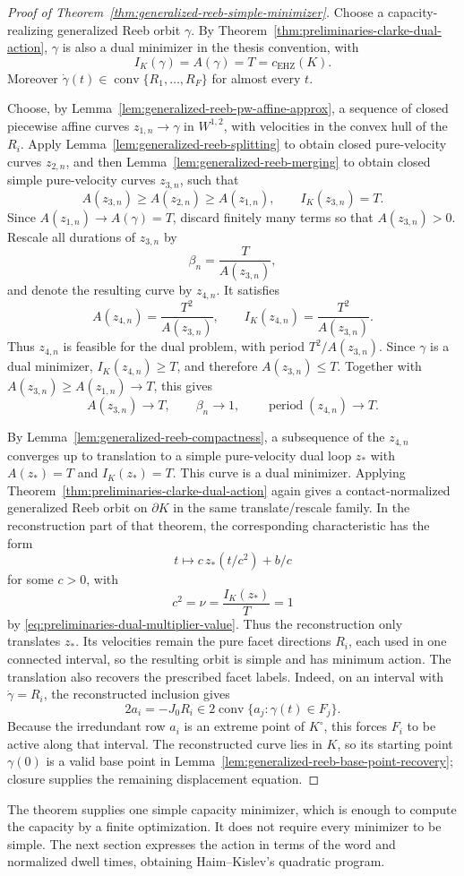 \begin{proof}[Proof of Theorem~\ref{thm:generalized-reeb-simple-minimizer}]
Choose a capacity-realizing generalized Reeb orbit \(\gamma\). By
Theorem~\ref{thm:preliminaries-clarke-dual-action}, \(\gamma\) is also a dual
minimizer in the thesis convention, with
\[
  I_K(\gamma)=A(\gamma)=T=c_{\mathrm{EHZ}}(K).
\]
Moreover \(\dot\gamma(t)\in\operatorname{conv}\{R_1,\ldots,R_F\}\) for almost
every \(t\).

Choose, by Lemma~\ref{lem:generalized-reeb-pw-affine-approx}, a sequence of
closed piecewise affine curves \(z_{1,n}\to\gamma\) in \(W^{1,2}\), with
velocities in the convex hull of the \(R_i\). Apply
Lemma~\ref{lem:generalized-reeb-splitting} to obtain closed pure-velocity
curves \(z_{2,n}\), and then Lemma~\ref{lem:generalized-reeb-merging} to obtain
closed simple pure-velocity curves \(z_{3,n}\), such that
\[
  A(z_{3,n})\geq A(z_{2,n})\geq A(z_{1,n}),
  \qquad
  I_K(z_{3,n})=T.
\]
Since \(A(z_{1,n})\to A(\gamma)=T\), discard finitely many terms so that
\(A(z_{3,n})>0\). Rescale all durations of \(z_{3,n}\) by
\[
  \beta_n=\frac{T}{A(z_{3,n})},
\]
and denote the resulting curve by \(z_{4,n}\). It satisfies
\[
  A(z_{4,n})=\frac{T^2}{A(z_{3,n})},
  \qquad
  I_K(z_{4,n})=\frac{T^2}{A(z_{3,n})}.
\]
Thus \(z_{4,n}\) is feasible for the dual problem, with period
\(T^2/A(z_{3,n})\). Since \(\gamma\) is a dual minimizer,
\(I_K(z_{4,n})\geq T\), and therefore \(A(z_{3,n})\leq T\). Together with
\(A(z_{3,n})\geq A(z_{1,n})\to T\), this gives
\[
  A(z_{3,n})\to T,
  \qquad \beta_n\to1,
  \qquad \operatorname{period}(z_{4,n})\to T.
\]

By Lemma~\ref{lem:generalized-reeb-compactness}, a subsequence of the \(z_{4,n}\)
converges up to translation to a simple pure-velocity dual loop \(z_*\)
with \(A(z_*)=T\) and \(I_K(z_*)=T\). This curve is a dual minimizer. Applying
Theorem~\ref{thm:preliminaries-clarke-dual-action} again gives a
contact-normalized generalized Reeb orbit on \(\partial K\) in the same
translate/rescale family. In the reconstruction part of that theorem, the
corresponding characteristic has the form
\[
  t\longmapsto c\,z_*(t/c^2)+b/c
\]
for some \(c>0\), with
\[
  c^2=\nu=\frac{I_K(z_*)}{T}=1
\]
by \eqref{eq:preliminaries-dual-multiplier-value}. Thus the reconstruction
only translates \(z_*\). Its velocities
remain the pure facet directions \(R_i\), each used in one connected interval,
so the resulting orbit is simple and has minimum action.  The translation also
recovers the prescribed facet labels.  Indeed, on an interval with
\(\dot\gamma=R_i\), the reconstructed inclusion gives
\[
  2a_i=-J_0R_i
  \in 2\operatorname{conv}\{a_j:\gamma(t)\in F_j\}.
\]
Because the irredundant row \(a_i\) is an extreme point of \(K^\circ\), this
forces \(F_i\) to be active along that interval.  The reconstructed curve lies
in \(K\), so its starting point \(\gamma(0)\) is a valid base point in
Lemma~\ref{lem:generalized-reeb-base-point-recovery}; closure supplies the
remaining displacement equation.
\end{proof}

The theorem supplies one simple capacity minimizer, which is enough to
compute the capacity by a finite optimization. It does not require every
minimizer to be simple. The next section expresses the action in terms of
the word and normalized dwell times, obtaining Haim--Kislev's quadratic
program.
